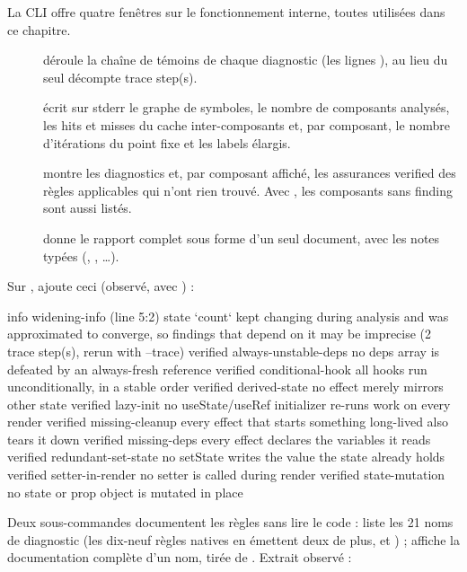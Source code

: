 La CLI offre quatre fenêtres sur le fonctionnement interne, toutes utilisées dans ce chapitre.
\begin{description}
  \item[] déroule la chaîne de témoins de chaque diagnostic (les lignes ), au lieu du seul décompte  trace step(s)\fg{}.
  \item[] écrit sur stderr le graphe de symboles, le nombre de composants analysés, les hits et misses du cache inter-composants et, par composant, le nombre d'itérations du point fixe et les labels élargis.
  \item[] montre les diagnostics \Info{} et, par composant affiché, les assurances \og verified\fg{} des règles applicables qui n'ont rien trouvé. Avec , les composants sans finding sont aussi listés.
  \item[] donne le rapport complet sous forme d'un seul document, avec les notes typées (, , \ldots).
\end{description}

Sur ,  ajoute ceci (observé, avec ) :

\begin{sortie}
    info   widening-info  (line 5:2)  state `count` kept changing during analysis and was approximated to converge, so findings that depend on it may be imprecise
       (2 trace step(s), rerun with --trace)
    verified  always-unstable-deps  no deps array is defeated by an always-fresh reference
    verified  conditional-hook  all hooks run unconditionally, in a stable order
    verified  derived-state  no effect merely mirrors other state
    verified  lazy-init  no useState/useRef initializer re-runs work on every render
    verified  missing-cleanup  every effect that starts something long-lived also tears it down
    verified  missing-deps  every effect declares the variables it reads
    verified  redundant-set-state  no setState writes the value the state already holds
    verified  setter-in-render  no setter is called during render
    verified  state-mutation  no state or prop object is mutated in place
\end{sortie}

Deux sous-commandes documentent les règles sans lire le code :  liste les 21 noms de diagnostic (les dix-neuf règles natives en émettent deux de plus,  et ) ;  affiche la documentation complète d'un nom, tirée de . Extrait observé :

